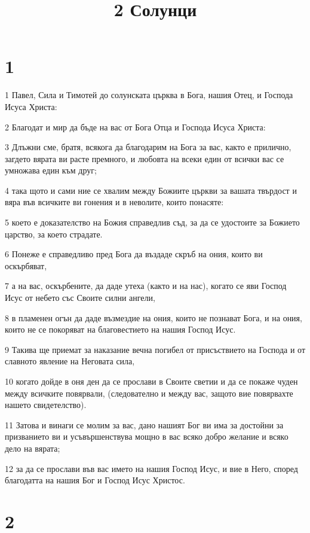 

\title{2 Солунци}


\chapter{1}

\par 1 Павел, Сила и Тимотей до солунската църква в Бога, нашия Отец, и Господа Исуса Христа:
\par 2 Благодат и мир да бъде на вас от Бога Отца и Господа Исуса Христа:
\par 3 Длъжни сме, братя, всякога да благодарим на Бога за вас, както е прилично, загдето вярата ви расте премного, и любовта на всеки един от всички вас се умножава един към друг;
\par 4 така щото и сами ние се хвалим между Божиите църкви за вашата твърдост и вяра във всичките ви гонения и в неволите, които понасяте:
\par 5 което е доказателство на Божия справедлив съд, за да се удостоите за Божието царство, за което страдате.
\par 6 Понеже е справедливо пред Бога да въздаде скръб на ония, които ви оскърбяват,
\par 7 а на вас, оскърбените, да даде утеха (както и на нас), когато се яви Господ Исус от небето със Своите силни ангели,
\par 8 в пламенен огън да даде възмездие на ония, които не познават Бога, и на ония, които не се покоряват на благовестието на нашия Господ Исус.
\par 9 Такива ще приемат за наказание вечна погибел от присъствието на Господа и от славното явление на Неговата сила,
\par 10 когато дойде в оня ден да се прослави в Своите светии и да се покаже чуден между всичките повярвали, (следователно и между вас, защото вие повярвахте нашето свидетелство).
\par 11 Затова и винаги се молим за вас, дано нашият Бог ви има за достойни за призванието ви и усъвършенствува мощно в вас всяко добро желание и всяко дело на вярата;
\par 12 за да се прослави във вас името на нашия Господ Исус, и вие в Него, според благодатта на нашия Бог и Господ Исус Христос.

\chapter{2}

